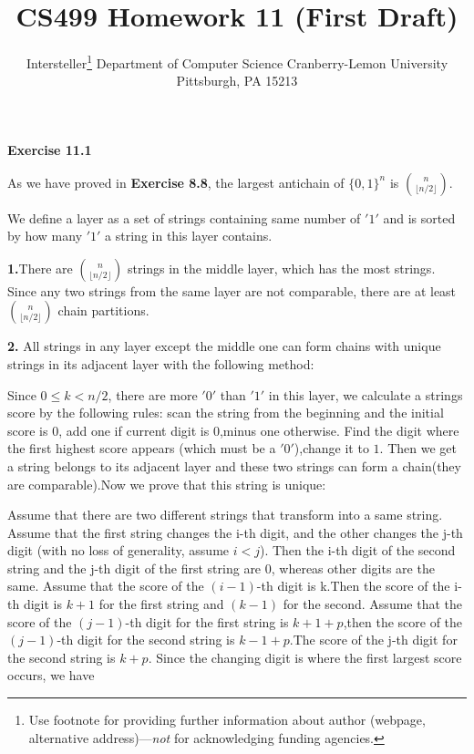 \documentclass{article} %
\title{CS499 Homework 11 (First Draft)}
\author{
	Intersteller\thanks{ Use footnote for providing further information
		about author (webpage, alternative address)---\emph{not} for acknowledging
		funding agencies.}
	Department of Computer Science
	Cranberry-Lemon University
	Pittsburgh, PA 15213
}
\begin{document}
	
	
	\maketitle
\textbf{Exercise 11.1}\par

	 As we have proved in \textbf{Exercise 8.8}, the largest antichain of $\{0,1\}^n$ is $\binom{n}{\lfloor n/2\rfloor}$. \par

	 We define a layer as a set of strings containing same number of $'1'$ and is sorted by how many  $'1'$ a string in this layer contains.\par

	 \textbf{1.}There are $\binom{n}{\lfloor n/2\rfloor}$ strings in the middle layer, which has the most strings. Since any two strings from the same layer are not comparable, there are at least $\binom{n}{\lfloor n/2\rfloor}$ chain partitions.\par

	 \textbf{2.} All strings in any layer except the middle one can form chains with unique strings in its adjacent layer with the following method:\par

	 Since $0\le k < n/2 $, there are more $'0'$ than $'1'$ in this layer, we calculate a strings score by the following rules: scan the string from the beginning and the initial score is $0$, add one if current digit is $0$,minus one otherwise. Find the digit where the first highest score appears (which must be a $'0'$),change it to $1$. Then we get a string belongs to its adjacent layer and these two strings can form a chain(they are comparable).Now we prove that this string is unique:\par

	 Assume that there are two different strings that transform into a same string. Assume that the first string changes the i-th digit, and the other changes the j-th digit (with no loss of generality, assume $i<j$).  Then the i-th digit of the second string and the j-th digit of the first string are $0$, whereas other digits are the same. Assume that the score of the $(i-1)$-th digit is k.Then the score of the i-th digit is $k+1$ for the first string and $(k-1)$ for the second. Assume that the score of the $(j-1)$-th digit for the first string is $k+1+p$,then the score of the $(j-1)$-th digit for the second string is $k-1+p$.The score of the j-th digit for the second string is $k+p$. Since the changing digit is where the first largest score occurs, we have
\end{document}
